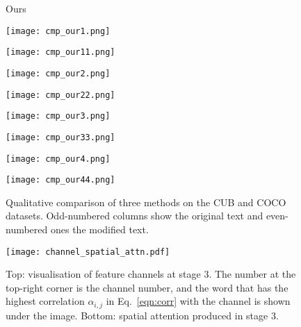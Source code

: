 \documentclass{article}
\begin{document}
\begin{figure}[t]
\begin{minipage}{0.12\textwidth}\raggedright
\scriptsize{Ours}\\
\end{minipage}
\quad\begin{minipage}{0.10\textwidth}
\texttt{[image: cmp\_our1.png]}
\end{minipage}
\noindent\begin{minipage}{0.10\textwidth}
\texttt{[image: cmp\_our11.png]}
\end{minipage}
\noindent\begin{minipage}{0.10\textwidth}
\texttt{[image: cmp\_our2.png]}
\end{minipage}
\noindent\begin{minipage}{0.10\textwidth}
\texttt{[image: cmp\_our22.png]}
\end{minipage}
\noindent\begin{minipage}{0.10\textwidth}
\texttt{[image: cmp\_our3.png]}
\end{minipage}
\noindent\begin{minipage}{0.10\textwidth}
\texttt{[image: cmp\_our33.png]}
\end{minipage}
\noindent\begin{minipage}{0.10\textwidth}
\texttt{[image: cmp\_our4.png]}
\end{minipage}
\noindent\begin{minipage}{0.10\textwidth}
\texttt{[image: cmp\_our44.png]}
\end{minipage}
\hfill \centering
\caption{Qualitative comparison of three methods on the CUB and COCO datasets. Odd-numbered columns show the original text and even-numbered ones the modified text.}
\label{fig:qual_cmp}
\end{figure}

\begin{figure}[ht]
\begin{minipage}{0.90\textwidth}
\texttt{[image: channel\_spatial\_attn.pdf]}
\end{minipage}
\centering
\caption{Top: visualisation of feature channels at stage 3. The number at the top-right corner is the channel number, and the word that has the highest correlation $\alpha_{i,j}$ in Eq.~\ref{eqn:corr} with the channel is shown under the image. Bottom: spatial attention produced in stage 3.}
\label{fig:channel}
\end{figure}
\end{document}
